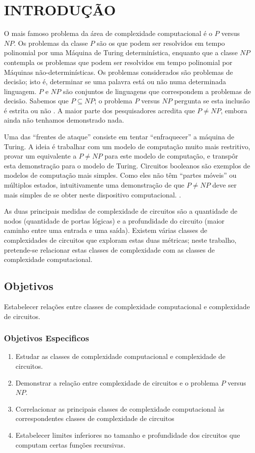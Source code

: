 \chapter{INTRODUÇÃO}

O mais famoso problema da área de complexidade computacional
é o $P$ versus $NP$.
Os problemas da classe $P$
são os que podem ser resolvidos em tempo polinomial
por uma Máquina de Turing determinística,
enquanto que a classe $NP$
contempla os problemas que podem ser resolvidos em tempo polinomial
por Máquinas não-determinísticas.
Os problemas considerados são problemas de decisão;
isto é,
determinar se uma palavra está ou não
numa determinada linguagem.
$P$ e $NP$ são conjuntos de linguagens
que correspondem a problemas de decisão.
Sabemos que $P \subseteq NP$;
o problema $P$ versus $NP$
pergunta se esta inclusão é estrita ou não \cite{Sipser2006}.
A maior parte dos pesquisadores acredita que $P \neq NP$,
embora ainda não tenhamos demonstrado nada.

Uma das ``frentes de ataque''
consiste em tentar ``enfraquecer''
a máquina de Turing.
A ideia é trabalhar com um modelo de computação muito mais restritivo,
provar um equivalente a $P \neq NP$
para este modelo de computação,
e transpôr esta demonstração para o modelo de Turing.
Circuitos booleanos
são exemplos de modelos de computação mais simples.
Como eles não têm ``partes móveis''
ou múltiplos estados,
intuitivamente uma demonstração de que $P \neq NP$
deve ser mais simples de se obter
neste dispositivo computacional. \cite{Hastad1987}.

As duas principais medidas
de complexidade de circuitos
são a quantidade de nodos
(quantidade de portas lógicas)
e a profundidade do circuito
(maior caminho entre uma entrada e uma saída).
Existem várias classes de complexidades de circuitos
que exploram estas duas métricas;
neste trabalho,
pretende-se relacionar estas classes de complexidade
com as classes de complexidade computacional.

\section{Objetivos}

Estabelecer relações entre classes de complexidade computacional
e complexidade de circuitos.

\subsection{Objetivos Especificos}

\begin{enumerate}
    \item Estudar as classes de complexidade computacional
        e complexidade de circuitos.
    \item Demonstrar a relação entre complexidade de circuitos
        e o problema $P$ versus $NP$.
    \item Correlacionar as principais classes
        de complexidade computacional
        às correspondentes classes de complexidade de circuitos
    \item Estabelecer limites inferiores no tamanho
        e profundidade dos circuitos
        que computam certas funções recursivas.
\end{enumerate}
